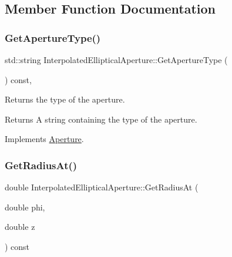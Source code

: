 \subsection{Member Function Documentation}
\mbox{\label{classInterpolatedEllipticalAperture_a02a87b57b089796ccf55c9bbe16a11ec}} 
\subsubsection{\texorpdfstring{Get\+Aperture\+Type()}{GetApertureType()}}
{\footnotesize\ttfamily std\+::string Interpolated\+Elliptical\+Aperture\+::\+Get\+Aperture\+Type (\begin{DoxyParamCaption}{ }\end{DoxyParamCaption}) const\hspace{0.3cm}{\ttfamily [inline]}, {\ttfamily [virtual]}}

Returns the type of the aperture. \begin{DoxyReturn}{Returns}
A string containing the type of the aperture. 
\end{DoxyReturn}


Implements \hyperlink{classAperture_ad7af612271a0586feea83c38549dfb75}{Aperture}.

\mbox{\label{classInterpolatedEllipticalAperture_adcbc99d397eba723e88877d199c035d8}} 
\subsubsection{\texorpdfstring{Get\+Radius\+At()}{GetRadiusAt()}}
{\footnotesize\ttfamily double Interpolated\+Elliptical\+Aperture\+::\+Get\+Radius\+At (\begin{DoxyParamCaption}\item[{double}]{phi,  }\item[{double}]{z }\end{DoxyParamCaption}) const\hspace{0.3cm}{\ttfamily [virtual]}}

